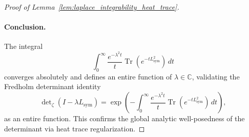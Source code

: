 \begin{proof}[Proof of Lemma~\ref{lem:laplace_integrability_heat_trace}]
\paragraph{Conclusion.}
The integral
\[
\int_0^\infty \frac{e^{-\lambda^2 t}}{t} \operatorname{Tr}(e^{-t L_{\mathrm{sym}}^2}) \, dt
\]
converges absolutely and defines an entire function of \( \lambda \in \mathbb{C} \), validating the Fredholm determinant identity
\[
\det\nolimits_\zeta(I - \lambda L_{\mathrm{sym}}) = \exp\left( -\int_0^\infty \frac{e^{-\lambda^2 t}}{t} \operatorname{Tr}(e^{-t L_{\mathrm{sym}}^2})\, dt \right),
\]
as an entire function. This confirms the global analytic well-posedness of the determinant via heat trace regularization.
\end{proof}
